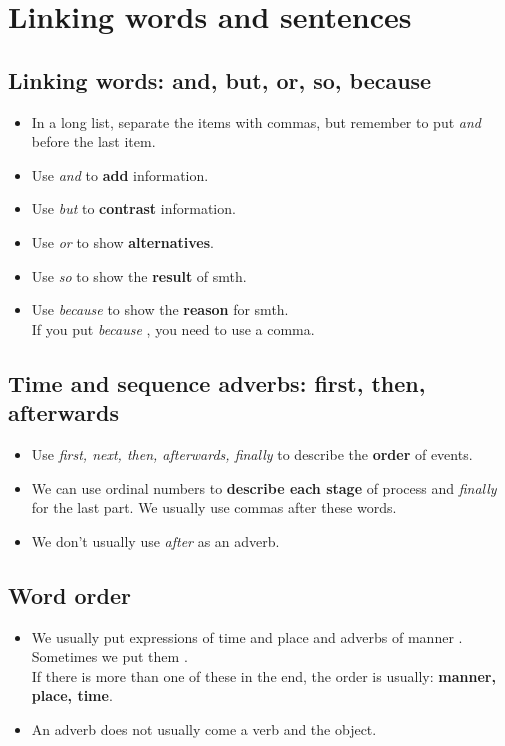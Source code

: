 \section{Linking words and sentences}

\subsection{Linking words: and, but, or, so, because}
\begin{itemize}
    \item In a long list, separate the items with commas, but remember to put \textit{and} before the last item.
    \item Use \textit{and} to \textbf{add} information.
    \item Use \textit{but} to \textbf{contrast} information.
    \item Use \textit{or} to show \textbf{alternatives}.
    \item Use \textit{so} to show the \textbf{result} of smth.
    \item Use \textit{because} to show the \textbf{reason} for smth.\\
    If you put \textit{because} , you need to use a comma.
\end{itemize}

\subsection{Time and sequence adverbs: first, then, afterwards}
\begin{itemize}
    \item Use \textit{first, next, then, afterwards, finally} to describe the \textbf{order} of events.
    \item We can use ordinal numbers to \textbf{describe each stage} of process and \textit{finally} for the last part.
    We usually use commas after these words.
    \item[\ast] We don't usually use \textit{after} as an adverb.
\end{itemize}

\subsection{Word order}
\begin{itemize}
    \item We usually put expressions of time and place and adverbs of manner .
    Sometimes we put them .\\
    If there is more than one of these in the end, the order is usually: \textbf{manner, place, time}.
    \item[\ast] An adverb does not usually come  a verb and the object.
\end{itemize}

